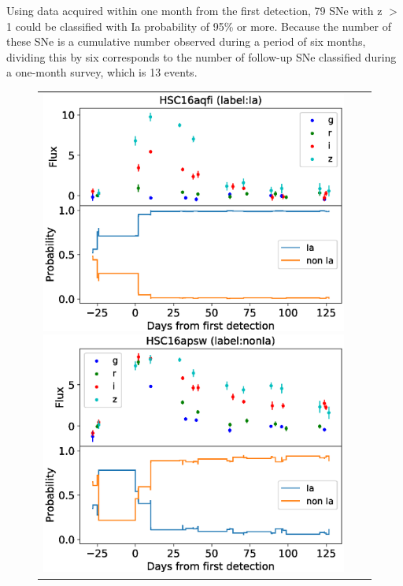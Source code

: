 \documentclass[proof]{pasj01}
\begin{document}
Using data acquired within one month from the first detection, 79 SNe with z $>$ 1 could be classified with Ia probability of 95\% or more.
Because the number of these SNe is a cumulative number observed during a period of six months, dividing this by six corresponds to the number of follow-up SNe classified during a one-month survey, which is 13 events.
%
\begin{figure}[htbp]
    \begin{tabular}{ccc}
        \begin{minipage}{0.33\hsize}
            \begin{center}
                \includegraphics[width=\columnwidth]{figures/lcp_aqfi.eps}
            \end{center}
        \end{minipage}
        \begin{minipage}{0.33\hsize}
            \begin{center}
                \includegraphics[width=\columnwidth]{figures/lcp_apsw.eps}

\end{center}
\end{minipage}
\end{tabular}
\end{figure}
\end{document}
